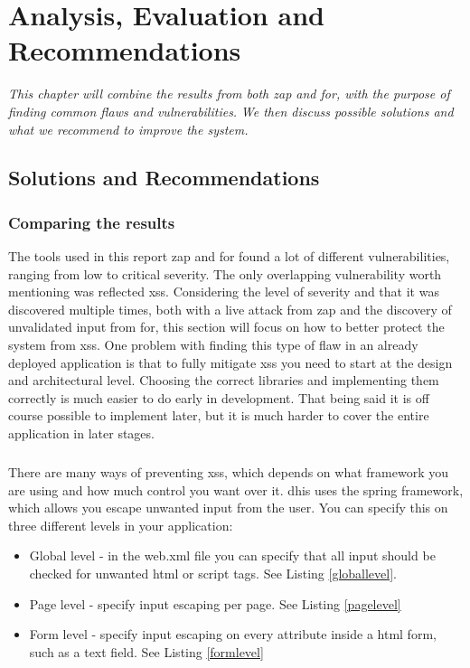 \documentclass[11pt,english,a4paper]{report}
\begin{document}
\chapter{Analysis, Evaluation and Recommendations}
\label{cha:part3}

\textit{This chapter will combine the results from both \gls{zap} and \gls{for}, with the purpose of finding common flaws and vulnerabilities.}
\textit{We then discuss possible solutions and what we recommend to improve the system.}

\section{Solutions and Recommendations}

\subsection{Comparing the results}
The tools used in this report \gls{zap} and \gls{for} found a lot of different vulnerabilities, ranging from low to critical severity.
The only overlapping vulnerability worth mentioning was reflected \gls{xss}.
Considering the level of severity and that it was discovered multiple times, both with a live attack from \gls{zap} and the discovery of unvalidated input from \gls{for}, this section will focus on how to better protect the system from \gls{xss}.
One problem with finding this type of flaw in an already deployed application is that to fully mitigate \gls{xss} you need to start at the design and architectural level.
Choosing the correct libraries and implementing them correctly is much easier to do early in development.
That being said it is off course possible to implement later, but it is much harder to cover the entire application in later stages.
\paragraph{}

There are many ways of preventing \gls{xss}, which depends on what framework you are using and how much control you want over it.
\gls{dhis} uses the spring framework, which allows you escape unwanted input from the user.
You can specify this on three different levels in your application\cite{preventxss}:
\begin{itemize}
\item Global level - in the web.xml file you can specify that all input should be checked for unwanted html or script tags. 
See Listing \ref{globallevel}.

\item Page level - specify input escaping per page. 
See Listing \ref{pagelevel}
\item Form level - specify input escaping on every attribute inside a html form, such as a text field.
See Listing \ref{formlevel}

\end{itemize}
\end{document}
